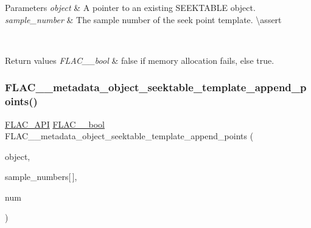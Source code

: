 \begin{DoxyParams}{Parameters}
{\em object} & A pointer to an existing S\+E\+E\+K\+T\+A\+B\+LE object. \\
\hline
{\em sample\+\_\+number} & The sample number of the seek point template. \textbackslash{}assert 
\begin{DoxyCode}{1}
\end{DoxyCode}
 
\begin{DoxyCode}{1}
\end{DoxyCode}
 \\
\hline
\end{DoxyParams}

\begin{DoxyRetVals}{Return values}
{\em F\+L\+A\+C\+\_\+\+\_\+bool} & {\ttfamily false} if memory allocation fails, else {\ttfamily true}. \\
\hline
\end{DoxyRetVals}
\mbox{\label{group__flac__metadata__object_gac27a59879fa8cdf47b75f8d73de82f0e}} 
\subsubsection{\texorpdfstring{FLAC\_\_metadata\_object\_seektable\_template\_append\_points()}{FLAC\_\_metadata\_object\_seektable\_template\_append\_points()}}
{\footnotesize\ttfamily \mbox{\hyperlink{group__flac__export_ga56ca07df8a23310707732b1c0007d6f5}{F\+L\+A\+C\+\_\+\+A\+PI}} \mbox{\hyperlink{ordinals_8h_a95103469f1cbd78b8cf250194985b34e}{F\+L\+A\+C\+\_\+\+\_\+bool}} F\+L\+A\+C\+\_\+\+\_\+metadata\+\_\+object\+\_\+seektable\+\_\+template\+\_\+append\+\_\+points (\begin{DoxyParamCaption}\item[{\mbox{\hyperlink{struct_f_l_a_c_____stream_metadata}{F\+L\+A\+C\+\_\+\+\_\+\+Stream\+Metadata}} $\ast$}]{object,  }\item[{\mbox{\hyperlink{ordinals_8h_aa78c8c70a3eb8a58af7436f278acde8e}{F\+L\+A\+C\+\_\+\+\_\+uint64}}}]{sample\+\_\+numbers\mbox{[}$\,$\mbox{]},  }\item[{unsigned}]{num }\end{DoxyParamCaption})}

